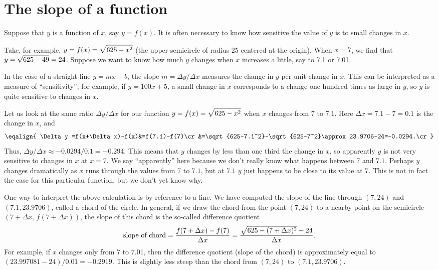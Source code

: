 \section{The slope of a function}{}{}

Suppose that $y$ is a function of $x$, say $y = f(x)$.
It is often necessary to know how sensitive the value of $y$
is to small changes in $x$.

\example
Take, for example, $\displaystyle y=f(x)=\sqrt{625-x^2}$ (the upper semicircle of radius
25 centered at the origin).  When $x=7$, we find that $\displaystyle y=\sqrt{625-49}=24$.
Suppose we want to know how much $y$ changes when $x$ increases a little,
say to 7.1 or 7.01.

In the case of a straight line $y=mx+b$, the slope $m=\Delta y/\Delta
x$ measures the change in $y$ per unit change in $x$. This can be
interpreted as a measure of ``sensitivity''; for example, if
$y=100x+5$, a small change in $x$ corresponds to a change one hundred
times as large in $y$, so $y$ is quite sensitive to changes in $x$.

Let us look at the
same ratio $\Delta y/\Delta x$ for our function
$\displaystyle y=f(x)=\sqrt{625-x^2}$ when $x$ changes from 7 to $7.1$.  Here $\Delta
x=7.1-7=0.1$ is the change in $x$, and
$$\eqalign{
\Delta y =f(x+\Delta x)-f(x)&=f(7.1)-f(7)\cr
         &=\sqrt{625-7.1^2}-\sqrt{625-7^2}\approx 23.9706-24=-0.0294.\cr
}$$
Thus, $\Delta y/\Delta x\approx -0.0294/0.1=-0.294$. This means that $y$
changes by less than one third the change in $x$, so apparently $y$ is
not very sensitive to changes in $x$ at $x=7$. We say ``apparently''
here because we don't really know what happens between 7 and
$7.1$. Perhaps $y$ changes dramatically as $x$ runs through the values
from 7 to $7.1$, but at $7.1$ $y$ just happens to be close to its
value at $7$. This is not in fact the case for this particular
function, but we don't yet know why.
\endexample

One way to interpret the above calculation is by reference to a line.
We have computed the slope of the line through $(7,24)$ and
$(7.1,23.9706)$, called a {\dfont chord} of the circle.
In general, if we draw the chord from the point $(7,24)$ to a nearby
point on the semicircle $(7+\Delta x,\,f(7+\Delta x))$, the slope of this
chord is the so-called {\dfont difference quotient}
$$
\hbox{slope~of~chord}={f(7+\Delta x)-f(7)\over \Delta x}=
{\sqrt{625-(7+\Delta x)^2}-24\over \Delta x}.
$$ For example, if $x$ changes only from 7 to 7.01, then the
difference quotient (slope of the chord) is approximately equal to
$(23.997081-24)/0.01=-0.2919$.  This is slightly less steep than the
chord from $(7,24)$ to $(7.1,23.9706)$.

